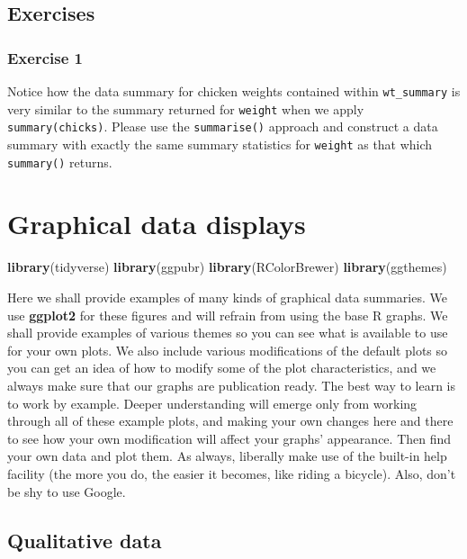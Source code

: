 \documentclass[english,10pt,a4paper,oneside]{book}
\newenvironment{Shaded}{\begin{snugshade}}{\end{snugshade}}
\newcommand{\KeywordTok}[1]{\textcolor[rgb]{0.13,0.29,0.53}{\textbf{#1}}}
\newcommand{\NormalTok}[1]{#1}
\theoremstyle{definition}
\theoremstyle{definition}
\theoremstyle{definition}
\theoremstyle{remark}
\begin{document}
\section{Exercises}\label{exercises}

\subsection{Exercise 1}\label{exercise-1}

Notice how the data summary for chicken weights contained within
\texttt{wt\_summary} is very similar to the summary returned for
\texttt{weight} when we apply \texttt{summary(chicks)}. Please use the
\texttt{summarise()} approach and construct a data summary with exactly
the same summary statistics for \texttt{weight} as that which
\texttt{summary()} returns.

\chapter{Graphical data displays}\label{graphical-data-displays}

\begin{Shaded}
\begin{Highlighting}[]
\KeywordTok{library}\NormalTok{(tidyverse)}
\KeywordTok{library}\NormalTok{(ggpubr)}
\KeywordTok{library}\NormalTok{(RColorBrewer)}
\KeywordTok{library}\NormalTok{(ggthemes)}
\end{Highlighting}
\end{Shaded}

Here we shall provide examples of many kinds of graphical data
summaries. We use \textbf{ggplot2} for these figures and will refrain
from using the base R graphs. We shall provide examples of various
themes so you can see what is available to use for your own plots. We
also include various modifications of the default plots so you can get
an idea of how to modify some of the plot characteristics, and we always
make sure that our graphs are publication ready. The best way to learn
is to work by example. Deeper understanding will emerge only from
working through all of these example plots, and making your own changes
here and there to see how your own modification will affect your graphs'
appearance. Then find your own data and plot them. As always, liberally
make use of the built-in help facility (the more you do, the easier it
becomes, like riding a bicycle). Also, don't be shy to use Google.

\section{Qualitative data}\label{qualitative-data-1}
\end{document}

